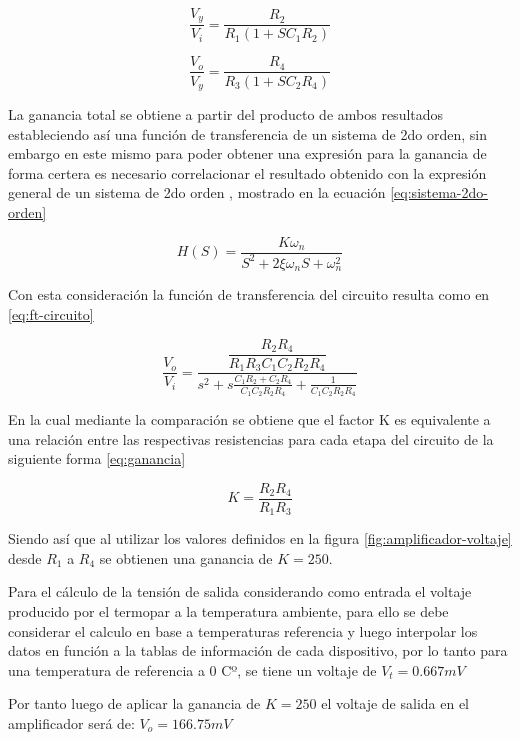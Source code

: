 \begin{equation}
	\frac{V_y}{V_i} = \frac{R_2}{R_1(1 + SC_1R_2)}
	\label{eq:ft-opam1}
\end{equation}

\begin{equation}
	\frac{V_o}{V_y} = \frac{R_4}{R_3(1 + SC_2R_4)}
	\label{eq:ft-opam2}
\end{equation}

La ganancia total se obtiene a partir del producto de ambos resultados estableciendo así una función de transferencia de un sistema de 2do orden, sin embargo en este mismo para poder obtener una expresión para la ganancia de forma certera es necesario correlacionar el resultado obtenido con la expresión general de un sistema de 2do orden \cite{ogata_ingenieria_control_moderna}, mostrado en la ecuación \ref{eq:sistema-2do-orden}

\begin{equation}
	H(S) = \frac{K\omega_n}{S^2 + 2\xi\omega_nS +  \omega^2_n} 
	\label{eq:sistema-2do-orden}
\end{equation}

Con esta consideración la función de transferencia del circuito resulta como en \ref{eq:ft-circuito}

\begin{equation}
	\frac{V_o}{V_i} = \frac{ \dfrac{R_2R_4}{R_1R_3C_1C_2R_2R_4} }{ s^2 +s\frac{C_1R_2 + C_2R_4}{C_1C_2R_2R_4} + \frac{1}{C_1C_2R_2R_4} }
	\label{eq:ft-circuito}
\end{equation}

En la cual mediante la comparación se obtiene que el factor K es equivalente a una relación entre las respectivas resistencias para cada etapa del circuito de la siguiente forma \ref{eq:ganancia}

\begin{equation}
	K = \frac{R_2R_4}{R_1R_3}
	\label{eq:ganancia}
\end{equation}

Siendo así que al utilizar los valores definidos en la figura \ref{fig:amplificador-voltaje} desde $R_1$ a $R_4$ se obtienen una ganancia de $K = 250$.

Para el cálculo de la tensión de salida considerando como entrada el voltaje producido por el termopar a la temperatura ambiente, para ello se debe considerar el calculo en base a temperaturas referencia y luego interpolar los datos en función a la tablas de información de cada dispositivo, por lo tanto para una temperatura de referencia a 0 Cº, se tiene un voltaje de $V_t = 0.667mV$

Por tanto luego de aplicar la ganancia de $K=250$ el voltaje de salida en el amplificador será de: $V_o = 166.75mV$
